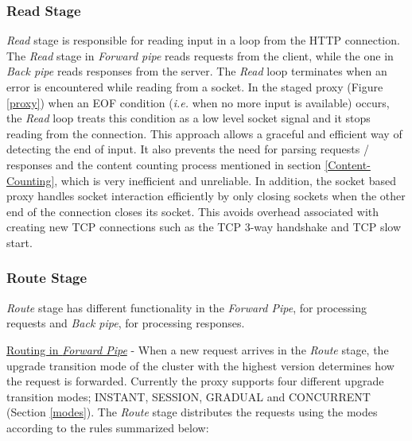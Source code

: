 \documentclass[a4paper,11pt,twoside]{report}
\begin{document}
\subsubsection*{Read Stage} 
\textit{Read} stage is responsible for reading input in a loop from the HTTP connection. The \textit{Read} stage in \textit{Forward pipe} reads requests from the client, while the one in \textit{Back pipe} reads responses from the server. The \textit{Read} loop terminates when an error is encountered while reading from a socket. In the staged proxy (Figure \ref{proxy}) when an EOF condition (\textit{i.e.} when no more input is available) occurs, the \textit{Read} loop treats this condition as a low level socket signal and it stops reading from the connection. This approach allows a graceful and efficient way of detecting the end of input. It also prevents the need for parsing requests / responses and the content counting process mentioned in section \ref{Content-Counting}, which is very inefficient and unreliable.  In addition, the socket based proxy handles socket interaction efficiently by only closing sockets when the other end of the connection closes its socket.  This avoids overhead associated with creating new TCP connections such as the TCP 3-way handshake and TCP slow start.
\subsubsection*{Route Stage} \label{route-stage} 
\textit{Route} stage has different functionality in the \textit{Forward Pipe}, for processing requests and \textit{Back pipe}, for processing responses. \bigskip  

\noindent
\underline{Routing in \textit{Forward Pipe}} - When a new request arrives in the \textit{Route} stage, the upgrade transition mode of the cluster with the highest version determines how the request is forwarded. Currently the proxy supports four different upgrade transition modes; INSTANT, SESSION, GRADUAL and CONCURRENT (Section \ref{modes}). The \textit{Route} stage distributes the requests using the modes according to the rules summarized below: 
\end{document}
